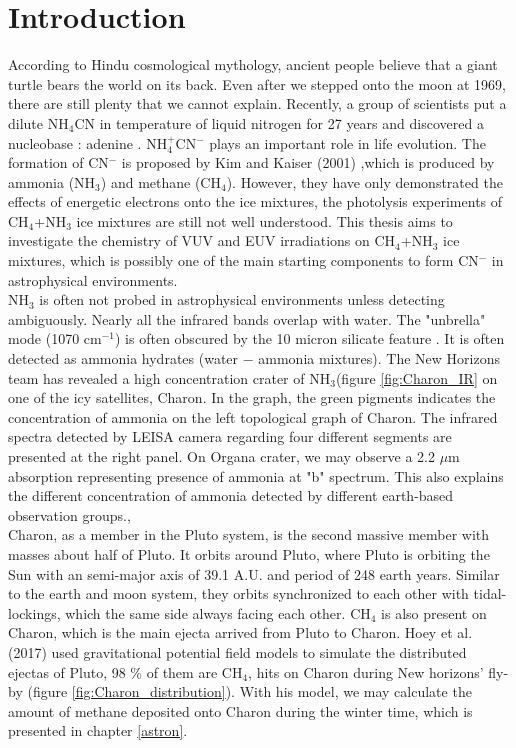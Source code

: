 \chapter{\protect Introduction}
\label{introduction}

According to Hindu cosmological mythology, ancient people believe that a giant turtle bears the world on its back. Even after we stepped onto the moon at 1969, there are still plenty that we cannot explain. Recently, a group of scientists put a dilute NH$_4$CN in temperature of liquid nitrogen for 27 years and discovered a nucleobase : adenine \cite{miyakawa2002cold}. NH$_4^+$CN$^-$ plays an important role in life evolution. The formation of CN$^-$ is proposed by Kim and Kaiser (2001) \cite{kim},which is produced by ammonia (NH$_3$) and methane (CH$_4$). However, they have only demonstrated the effects of energetic electrons onto the ice mixtures, the photolysis experiments of CH$_4$+NH$_3$ ice mixtures are still not well understood. This thesis aims to investigate the chemistry of VUV and EUV irradiations on CH$_4$+NH$_3$ ice mixtures, which is possibly one of the main starting components to form CN$^-$ in astrophysical environments.\\

NH$_3$ is often not probed in astrophysical environments unless detecting ambiguously. Nearly all the infrared bands overlap with water. The "unbrella" mode (1070 cm$^{-1}$) is often obscured by the 10 micron silicate feature \cite{d1986time}. It is often detected as ammonia hydrates (water $-$ ammonia mixtures)\cite{cook2007near}. The New Horizons team has revealed a high concentration crater of NH$_3$\cite{grundy2016surface}(figure \ref{fig:Charon_IR} on one of the icy satellites, Charon. In the graph, the green pigments indicates the concentration of ammonia on the left topological graph of Charon. The infrared spectra detected by LEISA camera regarding four different segments are presented at the right panel. On Organa crater, we may observe a 2.2 $\mu$m absorption representing presence of ammonia at "b" spectrum. This also explains the different concentration of ammonia detected by different earth-based observation groups.\cite{cook2007near},\cite{brown2000evidence}\\

Charon, as a member in the Pluto system, is the second massive member with masses about half of Pluto. It orbits around Pluto, where Pluto is orbiting the Sun with an semi-major axis of 39.1 A.U. and period of 248 earth years. Similar to the earth and moon system, they orbits synchronized to each other with tidal-lockings, which the same side always facing each other. CH$_4$ is also present on Charon, which is the main ejecta arrived from Pluto to Charon. Hoey et al. (2017)\cite{hoey2017rarefied} used gravitational potential field models to simulate the distributed ejectas of Pluto, 98 \% of them are CH$_4$, hits on Charon during New horizons' fly-by (figure \ref{fig:Charon_distribution}). With his model, we may calculate the amount of methane deposited onto Charon during the winter time, which is presented in chapter \ref{astron}.\\

